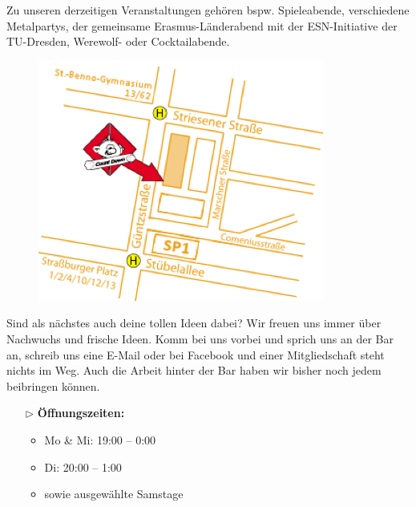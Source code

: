 \pagebreak

Zu unseren derzeitigen Veranstaltungen gehören bspw. Spieleabende, verschiedene Metalpartys, der gemeinsame Erasmus-Länderabend mit der ESN-Initiative der TU-Dresden, Werewolf- oder Cocktailabende.

\begin{figure}%
  \vspace{-.5cm}
  \includegraphics[width=\linewidth]{img/cd-anfahrt}
  \vspace{-1cm}
\end{figure}

Sind als nächstes auch deine tollen Ideen dabei?
Wir freuen uns immer über Nachwuchs und frische Ideen.
Komm bei uns vorbei und sprich uns an der Bar an, schreib uns eine E-Mail  oder bei Facebook  und einer Mitgliedschaft steht nichts im Weg.
Auch die Arbeit hinter der Bar haben wir bisher noch jedem beibringen können.

\begin{itemize}
    \item[$\rhd$] \textbf{Öffnungszeiten:}
    \begin{itemize}[noitemsep]
        \item Mo \& Mi: 19:00 – 0:00
        \item Di: 20:00 – 1:00
        \item sowie ausgewählte Samstage
    \end{itemize}
\end{itemize}

